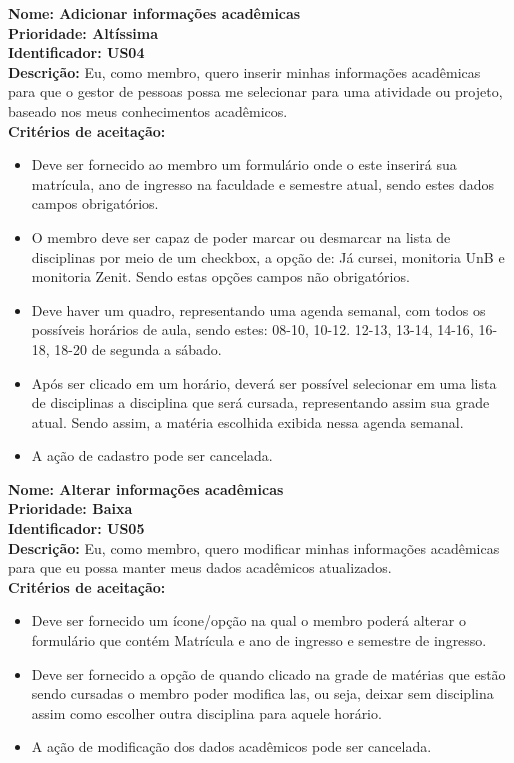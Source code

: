 \begin{anexosenv}
\textbf{Nome: Adicionar informações acadêmicas\\
    Prioridade: Altíssima\\
    Identificador: US04\\
    Descrição:} Eu, como membro, quero inserir minhas informações acadêmicas para que o gestor de pessoas possa me selecionar para uma atividade ou projeto, baseado nos meus conhecimentos acadêmicos.\\
\textbf{Critérios de aceitação:}        
\begin{itemize}
    \item Deve ser fornecido ao membro um formulário onde o este inserirá sua matrícula, ano de ingresso na faculdade e semestre atual, sendo estes dados campos obrigatórios.
    \item O membro deve ser capaz de poder marcar ou desmarcar na lista de disciplinas por meio de um checkbox, a opção de: Já cursei, monitoria UnB e monitoria Zenit. Sendo estas opções campos não obrigatórios.
    \item Deve haver um quadro, representando uma agenda semanal, com todos os possíveis horários de aula, sendo estes: 08-10, 10-12. 12-13, 13-14, 14-16, 16-18, 18-20 de segunda a sábado. 
    \item Após ser clicado em um horário, deverá ser possível selecionar em uma lista de disciplinas a disciplina que será cursada, representando assim sua grade atual. Sendo assim, a matéria escolhida exibida nessa agenda semanal.
    \item A ação de cadastro pode ser cancelada.
\end{itemize}

\textbf{Nome: Alterar informações acadêmicas\\
    Prioridade: Baixa\\
    Identificador: US05\\
    Descrição:} Eu, como membro, quero modificar minhas informações acadêmicas para que eu possa manter meus dados acadêmicos atualizados.\\
\textbf{Critérios de aceitação:}        
\begin{itemize}
    \item Deve ser fornecido um ícone/opção na qual o membro poderá alterar o formulário que contém Matrícula e ano de ingresso e semestre de ingresso.
    \item Deve ser fornecido a opção de quando clicado na grade de matérias que estão sendo cursadas o membro poder modifica las, ou seja, deixar sem disciplina assim como escolher outra disciplina para aquele horário.
    \item A ação de modificação dos dados acadêmicos pode ser cancelada.
\end{itemize}


\end{anexosenv}
